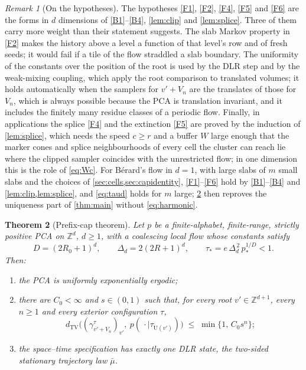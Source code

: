 \documentclass[11pt]{article}
\theoremstyle{plain}
\newtheorem{theorem}{Theorem}[section]
\theoremstyle{definition}
\theoremstyle{remark}
\newtheorem{remark}[theorem]{Remark}
\newcommand{\Z}{\mathbb{Z}}
\newcommand{\dtv}{d_{\mathrm{TV}}}
\newcommand{\ba}{\bar{\mu}}
\newcommand{\Ue}{\mathrm{U}}
\begin{document}
\begin{remark}[On the hypotheses]
\label{rem:flowhyp}
The hypotheses \ref{F1}, \ref{F2}, \ref{F4}, \ref{F5} and \ref{F6} are the forms in $d$ dimensions of \ref{B1}--\ref{B4}, \cref{lem:clip} and \cref{lem:splice}. Three of them carry more weight than their statement suggests. The slab Markov property in \ref{F2} makes the history above a level a function of that level's row and of fresh seeds; it would fail if a tile of the flow straddled a slab boundary. The uniformity of the constants over the position of the root is used by the DLR step and by the weak-mixing coupling, which apply the root comparison to translated volumes; it holds automatically when the samplers for $v'+V_n$ are the translates of those for $V_n$, which is always possible because the PCA is translation invariant, and it includes the finitely many residue classes of a periodic flow. Finally, in applications the splice \ref{F4} and the extinction \ref{F5} are proved by the induction of \cref{lem:splice}, which needs the speed $c\ge r$ and a buffer $W$ large enough that the marker cones and splice neighbourhoods of every cell the cluster can reach lie where the clipped sampler coincides with the unrestricted flow; in one dimension this is the role of \eqref{eq:Wc}. For B\'erard's flow in $d=1$, with large slabs of $m$ small slabs and the choices of \cref{sec:cells,sec:capidentity}, \ref{F1}--\ref{F6} hold by \ref{B1}--\ref{B4} and \cref{lem:clip,lem:splice}, and \eqref{eq:taud} holds for $m$ large; \cref{thm:prefix} then reproves the uniqueness part of \cref{thm:main} without \eqref{eq:harmonic}.
\end{remark}

\begin{theorem}[Prefix-cap theorem]
\label{thm:prefix}
Let $p$ be a finite-alphabet, finite-range, strictly positive PCA on $\Z^d$, $d\ge1$, with a coalescing local flow whose constants satisfy
\begin{equation}
D=(2R_0+1)^d,\qquad\Delta_d=2(2R+1)^d,\qquad\tau_*=e\,\Delta_d^{\,2}\,p_*^{1/D}<1.
\label{eq:taud}
\end{equation}
Then:
\begin{enumerate}[label=(\roman*)]
\item\label{it:p1} the PCA is uniformly exponentially ergodic;
\item\label{it:p2} there are $C_0<\infty$ and $s\in(0,1)$ such that, for every root $v'\in\Z^{d+1}$, every $n\ge1$ and every exterior configuration $\tau$,
\begin{equation}
\dtv\bigl((\gamma^\tau_{v'+V_n})_{v'},\ p(\,\cdot\mid\tau_{\Ue(v')})\bigr)\;\le\;\min\{1,\,C_0s^n\};
\label{eq:rootd}
\end{equation}
\item\label{it:p3} the space--time specification has exactly one DLR state, the two-sided stationary trajectory law $\ba$.
\end{enumerate}
\end{theorem}
\end{document}
